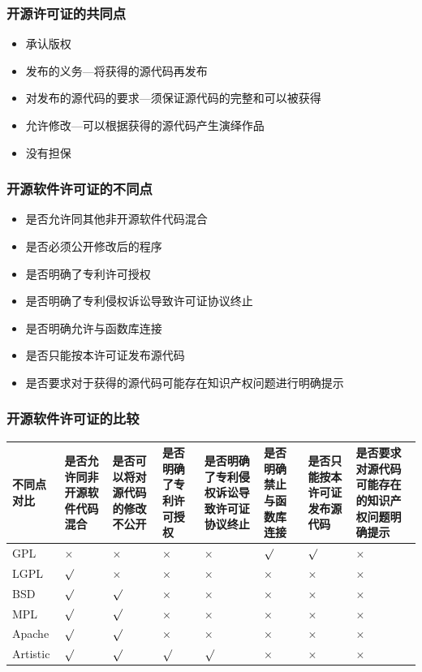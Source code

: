 \documentclass[compress]{beamer}
\begin{document}
\begin{frame}
\frametitle{开源许可证的共同点}
\begin{itemize}
\item 承认版权
\item 发布的义务---将获得的源代码再发布
\item 对发布的源代码的要求---须保证源代码的完整和可以被获得
\item 允许修改---可以根据获得的源代码产生演绎作品
\item 没有担保
\end{itemize}

\end{frame}

\begin{frame}
\frametitle{开源软件许可证的不同点}
\begin{itemize}
\item 是否允许同其他非开源软件代码混合
\item 是否必须公开修改后的程序
\item 是否明确了专利许可授权
\item 是否明确了专利侵权诉讼导致许可证协议终止
\item 是否明确允许与函数库连接
\item 是否只能按本许可证发布源代码
\item 是否要求对于获得的源代码可能存在知识产权问题进行明确提示
\end{itemize}


\end{frame}

\begin{frame}
\frametitle{开源软件许可证的比较}

{\tiny
\begin{tabular}{|p{0.8cm}|p{1cm}|p{1cm}|p{1cm}|p{1cm}|p{1cm}|p{1cm}|p{1cm}|}\hline
不同点对比 & 是否允许同非开源软件代码混合 & 是否可以将对源代码的修改不公开
& 是否明确了专利许可授权 & 是否明确了专利侵权诉讼导致许可证协议终止
& 是否明确禁止与函数库连接 & 是否只能按本许可证发布源代码
& 是否要求对源代码可能存在的知识产权问题明确提示 \\ \hline
GPL & $\times$ & $\times$ & $\times$ & $\times$ & $\surd$ & $\surd$ & $\times$ \\ \hline
LGPL & $\surd$ & $\times$ & $\times$ & $\times$ & $\times$ & $\times$ & $\times$ \\ \hline
BSD & $\surd$ & $\surd$ & $\times$ & $\times$ & $\times$ & $\times$ & $\times$ \\ \hline
MPL & $\surd$ & $\surd$ & $\times$ & $\times$ & $\times$ & $\times$ & $\times$ \\ \hline
Apache & $\surd$ & $\surd$ & $\times$ & $\times$ & $\times$ & $\times$ & $\times$ \\ \hline
Artistic & $\surd$ & $\surd$ & $\surd$ & $\surd$ & $\times$ & $\times$ & $\times$ \\ \hline
\end{tabular}}

\end{frame}
\end{document}
